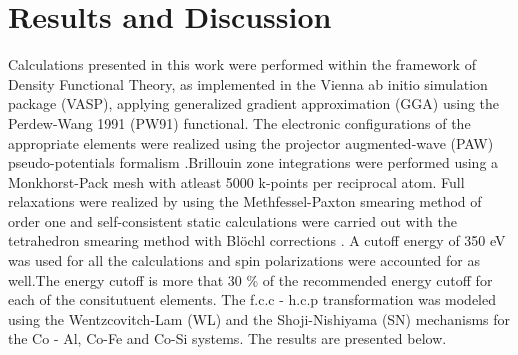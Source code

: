 \documentclass[preprint]{elsarticle}
\begin{document}
\section{Results and Discussion}
\label{Sec:results}
Calculations presented in this work  were performed within the framework of Density Functional Theory,
as implemented in the Vienna ab initio simulation package (VASP), applying generalized
gradient approximation (GGA) using the Perdew-Wang 1991 (PW91) functional\cite{Perdew1992}. The electronic configurations of the appropriate elements were realized using  the projector augmented-wave (PAW) pseudo-potentials formalism \cite{blochl1994paw}.Brillouin zone integrations were performed using a Monkhorst-Pack mesh \cite{monkhorst1976} with atleast 5000 k-points per reciprocal atom. Full relaxations were realized by using the Methfessel-Paxton smearing method of order one \cite{methfessel1989} and self-consistent static calculations were carried out  with the
tetrahedron smearing method with Bl\"{o}chl  corrections \cite{blochl1994improved}. A cutoff energy of 350 eV was used for all the calculations and spin polarizations were accounted for as well.The energy cutoff is more that 30 \% of the recommended energy cutoff for each of the consitutuent elements. 
The f.c.c - h.c.p transformation was modeled using the Wentzcovitch-Lam (WL) and the Shoji-Nishiyama (SN) mechanisms  for the Co - Al, Co-Fe and Co-Si systems. The results are presented below.
\end{document}
